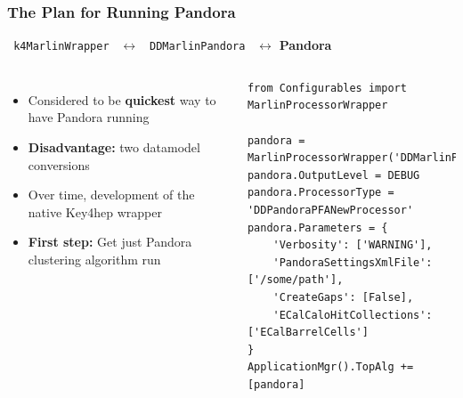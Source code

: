 \documentclass[aspectratio=169]{beamer}
\newcommand{\bluetext}[1]{%
  \textcolor{myBlue}{#1}
}
\newcommand{\redtext}[1]{%
  \textcolor{myRed}{#1}
}
\begin{document}
\begin{frame}[fragile]
  \frametitle{The Plan for Running Pandora}

  \begin{center}
    \texttt{\bluetext{k4MarlinWrapper}}
    $\leftrightarrow$ \texttt{\bluetext{DDMarlinPandora}}
    $\leftrightarrow$ \bluetext{\bf Pandora}
  \end{center}

  \begin{columns}[c]

    \begin{itemize}
      \item Considered to be \bluetext{\bf quickest} way to have Pandora running
      \item \redtext{\bf Disadvantage:} two datamodel conversions
      \item Over time, development of the native Key4hep wrapper
      \item \bluetext{\bf First step:} Get just Pandora clustering algorithm run
    \end{itemize}


    \tiny
    \begin{verbatim}
from Configurables import MarlinProcessorWrapper

pandora = MarlinProcessorWrapper('DDMarlinPandora')
pandora.OutputLevel = DEBUG
pandora.ProcessorType = 'DDPandoraPFANewProcessor'
pandora.Parameters = {
    'Verbosity': ['WARNING'],
    'PandoraSettingsXmlFile': ['/some/path'],
    'CreateGaps': [False],
    'ECalCaloHitCollections': ['ECalBarrelCells']
}
ApplicationMgr().TopAlg += [pandora]
\end{verbatim}
  \end{columns}
\end{frame}
\end{document}

